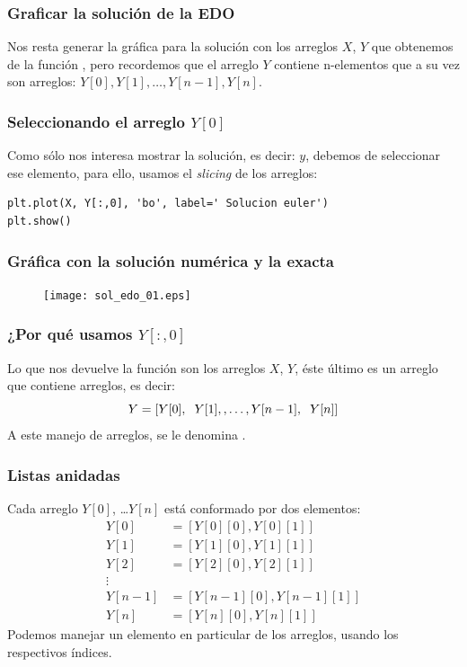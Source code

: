 \begin{frame}
\frametitle{Graficar la solución de la EDO}
Nos resta generar la gráfica para la solución con los arreglos $X$, $Y$ que obtenemos de la función , pero recordemos que el arreglo $Y$ contiene n-elementos que a su vez son arreglos: $Y[0], Y[1], \ldots, Y[n-1], Y[n]$.
\end{frame}
\begin{frame}
\frametitle{Seleccionando el arreglo $Y[0]$}
Como sólo nos interesa mostrar la solución, es decir: $y$, debemos de seleccionar ese elemento, para ello, usamos el \emph{slicing} de los arreglos:
\begin{lstlisting}[caption=Código para graficar la solución de la EDO, style=FormattedNumber, basicstyle=\linespread{1.1}\ttfamily=\small, columns=fullflexible]
plt.plot(X, Y[:,0], 'bo', label=' Solucion euler')
plt.show()
\end{lstlisting}
\end{frame}
\begin{frame}[fragile]
\frametitle{Gráfica con la solución numérica y la exacta}
\begin{figure}
	\centering
	\texttt{[image: sol\_edo\_01.eps]}
\end{figure}
\end{frame}
\begin{frame}
\frametitle{¿Por qué usamos $Y[:,0]$}
Lo que nos devuelve la función  son los arreglos $X$, $Y$, éste último es un arreglo que contiene arreglos, es decir:
\[  Y = [Y[0], \hspace{0.2cm} Y[1], , \ldots, Y[n-1], \hspace{0.2cm} Y[n] ] \]
A este manejo de arreglos, se le denomina .
\end{frame}
\begin{frame}
\frametitle{Listas anidadas}
Cada arreglo $Y[0]$, \ldots $Y[n]$ está conformado por dos elementos:
\begin{align*}
Y[0] &= [Y[0][0], Y[0][1] ] \\
Y[1] &= [Y[1][0], Y[1][1] ] \\
Y[2] &= [Y[2][0], Y[2][1] ] \\
\vdots \\
Y[n - 1] &= [Y[n - 1][0], Y[n -1 ][1] ] \\
Y[n] &= [Y[n][0], Y[n][1] ]
\end{align*}
Podemos manejar un elemento en particular de los arreglos, usando los respectivos índices.
\end{frame}
